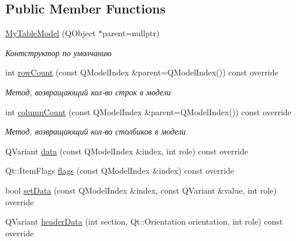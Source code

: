 \subsection*{Public Member Functions}
\begin{DoxyCompactItemize}
\item 
\mbox{\label{class_my_table_model_a09341446ff85069c54b77a3f0866747e}} 
\mbox{\hyperlink{class_my_table_model_a09341446ff85069c54b77a3f0866747e}{My\+Table\+Model}} (Q\+Object $\ast$parent=nullptr)
\begin{DoxyCompactList}\small\item\em Контструктор по умолчанию \end{DoxyCompactList}\item 
\mbox{\label{class_my_table_model_adc21fad64fbf352ad74a4669c1d9bddd}} 
int \mbox{\hyperlink{class_my_table_model_adc21fad64fbf352ad74a4669c1d9bddd}{row\+Count}} (const Q\+Model\+Index \&parent=Q\+Model\+Index()) const override
\begin{DoxyCompactList}\small\item\em Метод, возвращающий кол-\/во строк в модели \end{DoxyCompactList}\item 
\mbox{\label{class_my_table_model_ab50bbbb24b0037dfba3ae9628b8e1186}} 
int \mbox{\hyperlink{class_my_table_model_ab50bbbb24b0037dfba3ae9628b8e1186}{column\+Count}} (const Q\+Model\+Index \&parent=Q\+Model\+Index()) const override
\begin{DoxyCompactList}\small\item\em Метод, возвращающий кол-\/во столбиков в модели \end{DoxyCompactList}\item 
Q\+Variant \mbox{\hyperlink{class_my_table_model_affedfb28280a3ae512875ecfd8fad1e1}{data}} (const Q\+Model\+Index \&index, int role) const override
\item 
Qt\+::\+Item\+Flags \mbox{\hyperlink{class_my_table_model_a87bc6c586fac3a1cb7248865144e9e15}{flags}} (const Q\+Model\+Index \&index) const override
\item 
bool \mbox{\hyperlink{class_my_table_model_a9846177864f17c414cd77545e3d3a9cb}{set\+Data}} (const Q\+Model\+Index \&index, const Q\+Variant \&value, int role) override
\item 
Q\+Variant \mbox{\hyperlink{class_my_table_model_a2a78f29e1befdcab173d458d1f6ff6e1}{header\+Data}} (int section, Qt\+::\+Orientation orientation, int role) const override

\end{DoxyCompactItemize}
